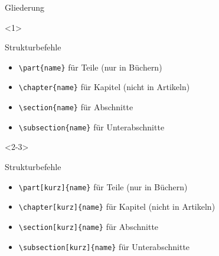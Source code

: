 \begin{Frame}[fragile,t]{Gliederung}
  \xxx

  \begin{onlyenv}<1>
    \begin{Block}{Strukturbefehle}
      \begin{itemize}
        \item \lstinline-\part{name}- für Teile (nur in Büchern)
        \item \lstinline-\chapter{name}- für Kapitel (nicht in Artikeln)
        \item \lstinline-\section{name}- für Abschnitte
        \item \lstinline-\subsection{name}- für Unterabschnitte
      \end{itemize}
    \end{Block}
  \end{onlyenv}

  \begin{onlyenv}<2-3>
    \begin{Block}{Strukturbefehle}
      \begin{itemize}
        \item \lstinline-\part[kurz]{name}- für Teile (nur in Büchern)
        \item \lstinline-\chapter[kurz]{name}- für Kapitel (nicht in Artikeln)
        \item \lstinline-\section[kurz]{name}- für Abschnitte
        \item \lstinline-\subsection[kurz]{name}- für Unterabschnitte
      \end{itemize}
    \end{Block}


\end{onlyenv}
\end{Frame}
